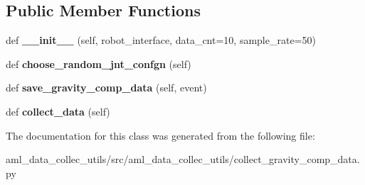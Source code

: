 \subsection*{Public Member Functions}
\begin{DoxyCompactItemize}
\item 
\hypertarget{classaml__data__collec__utils_1_1collect__gravity__comp__data_1_1_collect_gravity_comp_data_aa9326f995b23f38beee734657b7b0463}{}\label{classaml__data__collec__utils_1_1collect__gravity__comp__data_1_1_collect_gravity_comp_data_aa9326f995b23f38beee734657b7b0463} 
def {\bfseries \+\_\+\+\_\+init\+\_\+\+\_\+} (self, robot\+\_\+interface, data\+\_\+cnt=10, sample\+\_\+rate=50)
\item 
\hypertarget{classaml__data__collec__utils_1_1collect__gravity__comp__data_1_1_collect_gravity_comp_data_a94e8e8c3608993caa6e55fcd90c4ecd8}{}\label{classaml__data__collec__utils_1_1collect__gravity__comp__data_1_1_collect_gravity_comp_data_a94e8e8c3608993caa6e55fcd90c4ecd8} 
def {\bfseries choose\+\_\+random\+\_\+jnt\+\_\+confgn} (self)
\item 
\hypertarget{classaml__data__collec__utils_1_1collect__gravity__comp__data_1_1_collect_gravity_comp_data_a3084abc6f389d5930610e9a0a537a6d7}{}\label{classaml__data__collec__utils_1_1collect__gravity__comp__data_1_1_collect_gravity_comp_data_a3084abc6f389d5930610e9a0a537a6d7} 
def {\bfseries save\+\_\+gravity\+\_\+comp\+\_\+data} (self, event)
\item 
\hypertarget{classaml__data__collec__utils_1_1collect__gravity__comp__data_1_1_collect_gravity_comp_data_a841b1dda70c04964297beaee86345013}{}\label{classaml__data__collec__utils_1_1collect__gravity__comp__data_1_1_collect_gravity_comp_data_a841b1dda70c04964297beaee86345013} 
def {\bfseries collect\+\_\+data} (self)
\end{DoxyCompactItemize}


The documentation for this class was generated from the following file\+:\begin{DoxyCompactItemize}
\item 
aml\+\_\+data\+\_\+collec\+\_\+utils/src/aml\+\_\+data\+\_\+collec\+\_\+utils/collect\+\_\+gravity\+\_\+comp\+\_\+data.\+py\end{DoxyCompactItemize}
